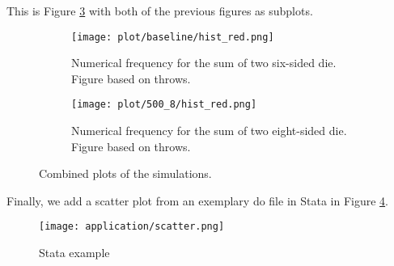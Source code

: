 \documentclass[12pt]{article}
\theoremstyle{definition}
\begin{document}
\newpage

This is Figure \ref{fig:figsubplots} with both of the previous figures as subplots. 

\begin{figure}[tbh!]
\begin{subfigure}{.5\textwidth}
  \centering
  \texttt{[image: plot/baseline/hist\_red.png]}  
  \caption{Numerical frequency for the sum of two six-sided die. Figure based on throws.}
  \label{fig:sub-first}
\end{subfigure}
\begin{subfigure}{.5\textwidth}
  \centering
  \texttt{[image: plot/500\_8/hist\_red.png]}  
  \caption{Numerical frequency for the sum of two eight-sided die. Figure based on throws.}
  \label{fig:sub-second}
\end{subfigure}
\caption{Combined plots of the simulations.}
\label{fig:figsubplots}
\end{figure}


Finally, we add a scatter plot from an exemplary do file in Stata in Figure \ref{fig:auto_scatter}.

\begin{figure}[tbh!]
\centering
\texttt{[image: application/scatter.png]}
\caption[]{Stata example}
\label{fig:auto_scatter}
\end{figure}



%

\end{document}

